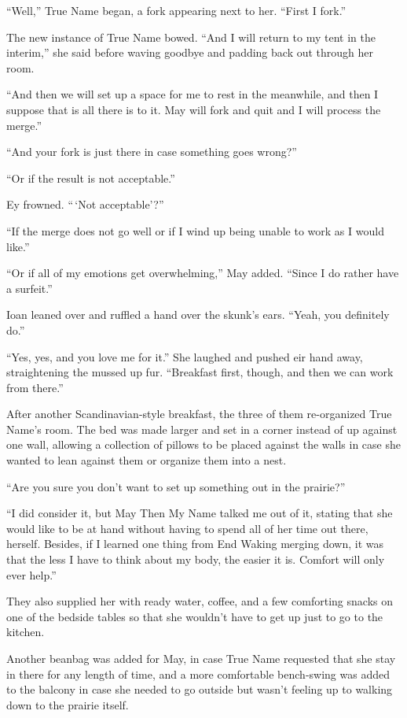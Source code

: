 ``Well,'' True Name began, a fork appearing next to her. ``First I fork.''

The new instance of True Name bowed. ``And I will return to my tent in the interim,'' she said before waving goodbye and padding back out through her room.

``And then we will set up a space for me to rest in the meanwhile, and then I suppose that is all there is to it. May will fork and quit and I will process the merge.''

``And your fork is just there in case something goes wrong?''

``Or if the result is not acceptable.''

Ey frowned. ``\,`Not acceptable'?''

``If the merge does not go well or if I wind up being unable to work as I would like.''

``Or if all of my emotions get overwhelming,'' May added. ``Since I do rather have a surfeit.''

Ioan leaned over and ruffled a hand over the skunk's ears. ``Yeah, you definitely do.''

``Yes, yes, and you love me for it.'' She laughed and pushed eir hand away, straightening the mussed up fur. ``Breakfast first, though, and then we can work from there.''

After another Scandinavian-style breakfast, the three of them re-organized True Name's room. The bed was made larger and set in a corner instead of up against one wall, allowing a collection of pillows to be placed against the walls in case she wanted to lean against them or organize them into a nest.

``Are you sure you don't want to set up something out in the prairie?''

``I did consider it, but May Then My Name talked me out of it, stating that she would like to be at hand without having to spend all of her time out there, herself. Besides, if I learned one thing from End Waking merging down, it was that the less I have to think about my body, the easier it is. Comfort will only ever help.''

They also supplied her with ready water, coffee, and a few comforting snacks on one of the bedside tables so that she wouldn't have to get up just to go to the kitchen.

Another beanbag was added for May, in case True Name requested that she stay in there for any length of time, and a more comfortable bench-swing was added to the balcony in case she needed to go outside but wasn't feeling up to walking down to the prairie itself.

